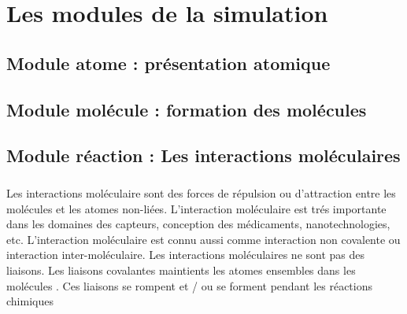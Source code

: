 \chapter{Les modules de la simulation}
\label{les_modules_de_la_simulation}

\newcommand*{\mytextstyle}{\sffamily\Large\bfseries\color{black!85}}
\newcommand{\arcarrow}[3]{%
   \pgfmathsetmacro{\rin}{1.7}
   \pgfmathsetmacro{\rmid}{2.2}
   \pgfmathsetmacro{\rout}{2.7}
   \pgfmathsetmacro{\astart}{#1}
   \pgfmathsetmacro{\aend}{#2}
   \pgfmathsetmacro{\atip}{5}
   \fill[mygray, very thick] (\astart+\atip:\rin)
                         arc (\astart+\atip:\aend:\rin)
      -- (\aend-\atip:\rmid)
      -- (\aend:\rout)   arc (\aend:\astart+\atip:\rout)
      -- (\astart:\rmid) -- cycle;
   \path[
      decoration = {
         text along path,
         text = {|\mytextstyle|#3},
         text align = {align = center},
         raise = -1.0ex
      },
      decorate
   ](\astart+\atip:\rmid) arc (\astart+\atip:\aend+\atip:\rmid);
}
\section{ Module atome : présentation atomique }
\section{ Module molécule : formation des molécules}
\section{ Module réaction : Les interactions moléculaires}

\paragraph{}
Les interactions moléculaire sont des forces de répulsion ou d'attraction entre les molécules et les atomes non-liées. L'interaction moléculaire est trés importante dans les domaines des capteurs, conception des médicaments, nanotechnologies, etc. L'interaction moléculaire est connu aussi comme interaction non covalente ou interaction inter-moléculaire. Les interactions moléculaires ne sont pas des liaisons. Les liaisons covalantes  maintients les atomes ensembles dans les molécules . Ces liaisons se rompent et / ou se forment pendant les réactions chimiques


